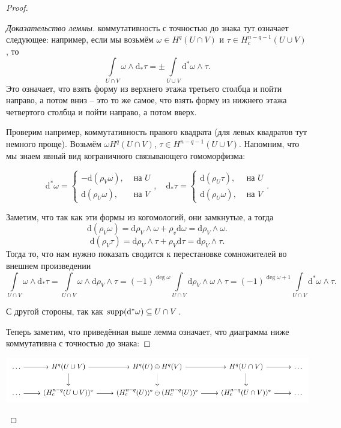 \begin{proof}
\begin{proof}[Доказательство леммы]
 	 	коммутативность с точностью до знака тут означает следующее: например, если мы возьмём $\omega \in H^q(U \cap V)$ и $\tau \in H^{n - q - 1}_{c}(U \cup V)$, то 
 	 	\[
 	 		\int\limits_{U \cap V} \omega \wedge \mathrm{d}_* \tau = \pm \int\limits_{U \cup V} \mathrm{d}^* \omega \wedge \tau.
 	 	\]
 	 	Это означает, что взять форму из верхнего этажа третьего столбца  и пойти направо, а потом вниз -- это то же самое, что взять форму из нижнего этажа четвертого столбца и пойти направо, а потом вверх. 

 	 	Проверим например, коммутативность правого квадрата (для левых квадратов тут немного проще). Возьмём $\omega H^{q}(U \cap V)$, $\tau \in H^{n - q - 1}(U \cup V)$. Напомним, что мы знаем явный вид кограничного связывающего гомоморфизма:

 	 	\[
 	 		 \mathrm{d}^*\omega = \begin{cases} -\mathrm{d}(\rho_V \omega), & \text{ на } U \\ \mathrm{d}(\rho_U \omega), & \text{ на } V \end{cases}, \quad \mathrm{d}_* \tau = \begin{cases} \mathrm{d}(\rho_U \tau ), & \text{ на } U \\ \mathrm{d}(\rho_U \omega), & \text{ на } V \end{cases}. 
 		 \]	 

 		 Заметим, что так как эти формы из когомологий, они замкнутые, а тогда 
 		 \[
 		 	\mathrm{d}(\rho_V \omega) = \mathrm{d}\rho_V \wedge \omega + \rho_v \mathrm{d}\omega = \mathrm{d}\rho_V \wedge \omega.  
 		 \]
 		 \[
 		 	\mathrm{d}(\rho_V \tau) = \mathrm{d}\rho_V \wedge \tau + \rho_V \mathrm{d}\tau = \mathrm{d}\rho_V \wedge \tau.
 		 \]
 		 Тогда то, что нам нужно показать сводится к перестановке сомножителей во внешнем произведении 
 		 \[
 		 	\int\limits_{U \cap V} \omega \wedge \mathrm{d}_* \tau = \int\limits_{U \cap V} \omega \wedge \mathrm{d}\rho_V \wedge \tau = (-1)^{\deg{\omega}} \int\limits_{U \cap V} \mathrm{d}\rho_V \wedge \omega \wedge \tau = (-1)^{\deg{\omega} + 1} \int\limits_{U \cap V} \mathrm{d}^* \omega \wedge \tau.
 		 \]

 		 С другой стороны, так как $\supp\lr*{\mathrm{d}^* \omega } \subseteq U \cap V$. 

 		  Теперь заметим, что приведённая выше лемма означает, что диаграмма ниже коммутативна с точностью до знака: 

 		  \end{proof}

 	 \begin{center}
 	 	\includegraphics{lectures/7/pictures/cd_20.pdf}
 	 \end{center}


\end{proof}
